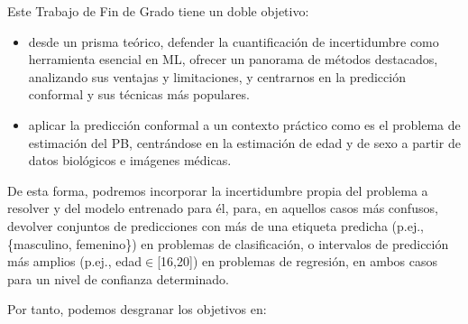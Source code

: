 Este Trabajo de Fin de Grado tiene un doble objetivo: 

\begin{itemize}

    \item desde un prisma teórico, defender la cuantificación de incertidumbre como herramienta esencial en ML, ofrecer un panorama de métodos destacados, analizando sus ventajas y limitaciones, y centrarnos en la predicción conformal y sus técnicas más populares.

    \item aplicar la predicción conformal a un contexto práctico como es el problema de estimación del PB, centrándose en la estimación de edad y de sexo a partir de datos biológicos e imágenes médicas.

\end{itemize}

De esta forma, podremos incorporar la incertidumbre propia del problema a resolver y del modelo entrenado para él, para, en aquellos casos más confusos, devolver conjuntos de predicciones con más de una etiqueta predicha (p.ej., \{masculino, femenino\}) en problemas de clasificación, o intervalos de predicción más amplios (p.ej., edad$\in$[16,20]) en problemas de regresión, en ambos casos para un nivel de confianza determinado.

Por tanto, podemos desgranar los objetivos en:


